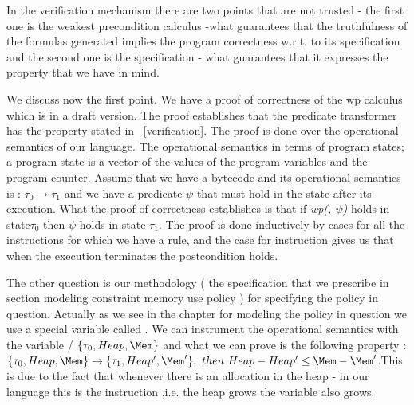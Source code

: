 
In the verification mechanism there are two points that are not trusted
- the first one is the weakest precondition calculus -what guarantees
that the truthfulness of the formulas generated implies the program
correctness w.r.t. to its specification and the second one is the
specification - what guarantees that it expresses the property that we
have in mind.


We discuss now the first point. We have a proof of correctness of the
wp calculus which is in a draft version. The proof establishes that the
predicate transformer has the property stated in ~\ref{verification}. 
The proof is done over the operational semantics of our language. The operational semantics in terms of program states; a program state is a vector of the values of
the program variables and the program counter.  
Assume that we have a  bytecode   and its operational semantics is
:  $\tau_0 \rightarrow \tau_1 $ and we have a predicate $\psi$ that must hold in the state after its execution.  
What the proof of correctness establishes is that if \textit{wp(, $\psi$) } holds in state$\tau_0$ then $\psi$
holds in state $\tau_1$. The proof is done inductively by cases for all the instructions for which
we have a rule, and the case for  instruction gives us
that when the execution terminates the postcondition holds.


The other question is our methodology ( the specification that
we prescribe in section modeling constraint memory use policy )
for specifying the policy in question. Actually as we see in the chapter
for modeling the policy in question we use a special variable called
\Mem. We can instrument the operational semantics with the variable
\Mem / $\{ \tau_0, Heap, \Mem\}$ and what we can prove is the
following property : $\{ \tau_0, Heap, \Mem \} \rightarrow \{ \tau_1,
Heap' ,\Mem' \} , \ then \ Heap - Heap' \le \Mem - \Mem' $.This is due
to the fact that whenever there is an allocation in the heap - in our
language this is the instruction \srcCode{\new},i.e. the heap grows
the variable \Mem also grows.
